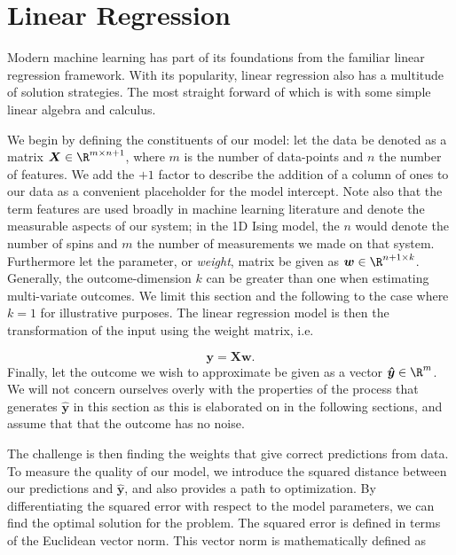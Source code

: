
\section{Linear Regression}\label{sec:LinReg}

Modern machine learning has part of its foundations from the familiar linear regression framework. With its popularity, linear regression also has a multitude of solution strategies. The most straight forward of which is with some simple linear algebra and calculus.

We begin by defining the constituents of our model: let the data be denoted as a matrix $\boldsymbol{X} \in \R^{m\times n+1}$, where $m$ is the number of data-points and $n$ the number of features. We add the $+1$ factor to describe the addition of a column of ones to our data as a convenient placeholder for the model intercept. Note also that the term features are used broadly in machine learning literature and denote the measurable aspects of our system; in the 1D Ising model, the $n$ would denote the number of spins and $m$ the number of measurements we made on that system. Furthermore let the parameter, or \textit{weight}, matrix be given as $\boldsymbol{w} \in \R^{n + 1\times k}$. Generally, the outcome-dimension $k$ can be greater than one when estimating multi-variate outcomes. We limit this section and the following to the case where $k=1$ for illustrative purposes. The linear regression model is then the transformation of the input using the weight matrix, i.e. 

\begin{equation}\label{eq:og_linreg}
\boldsymbol{y} = \boldsymbol{X}\boldsymbol{w}.
\end{equation}
\noindent Finally, let the outcome we wish to approximate be given as a vector $\boldsymbol{\hat{y}} \in \R^m$. We will not concern ourselves overly with the properties of the process that generates $\boldsymbol{\hat{y}}$ in this section as this is elaborated on in the following sections, and assume that that the outcome has no noise.

The challenge is then finding the weights that give correct predictions from data. To measure the quality of our model, we introduce the squared distance between our predictions and $\boldsymbol{\hat{y}}$, and also provides a path to optimization. By differentiating the squared error with respect to the model parameters, we can find the optimal solution for the problem. The squared error is defined in terms of the Euclidean vector norm. This vector norm is mathematically defined as

